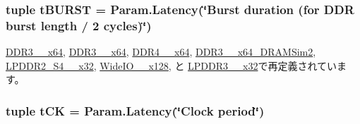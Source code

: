 \label{classDRAMCtrl_1_1DRAMCtrl_a37607d1e67471a6c3fdd8746152f911a}
\hypertarget{classDRAMCtrl_1_1DRAMCtrl_a8c64ef2dd5b5213f7c25ecffd077591f}{
\subsubsection[{tBURST}]{\setlength{\rightskip}{0pt plus 5cm}tuple {\bf tBURST} = Param.Latency(\char`\"{}Burst duration (for DDR burst length / 2 cycles)\char`\"{})}}
\label{classDRAMCtrl_1_1DRAMCtrl_a8c64ef2dd5b5213f7c25ecffd077591f}


\hyperlink{classDRAMCtrl_1_1DDR3__1600__x64_af962cc8ff13de9c28027368562b67c1e}{DDR3\_\_\-x64}, \hyperlink{classDRAMCtrl_1_1DDR3__2133__x64_af962cc8ff13de9c28027368562b67c1e}{DDR3\_\_\-x64}, \hyperlink{classDRAMCtrl_1_1DDR4__2400__x64_af962cc8ff13de9c28027368562b67c1e}{DDR4\_\_\-x64}, \hyperlink{classDRAMCtrl_1_1DDR3__1333__x64__DRAMSim2_af962cc8ff13de9c28027368562b67c1e}{DDR3\_\_\-x64\_\-DRAMSim2}, \hyperlink{classDRAMCtrl_1_1LPDDR2__S4__1066__x32_af962cc8ff13de9c28027368562b67c1e}{LPDDR2\_\-S4\_\_\-x32}, \hyperlink{classDRAMCtrl_1_1WideIO__200__x128_af962cc8ff13de9c28027368562b67c1e}{WideIO\_\_\-x128}, と \hyperlink{classDRAMCtrl_1_1LPDDR3__1600__x32_af962cc8ff13de9c28027368562b67c1e}{LPDDR3\_\_\-x32}で再定義されています。\hypertarget{classDRAMCtrl_1_1DRAMCtrl_a028d6bb21e2386ba31699d3c56396a6f}{
\subsubsection[{tCK}]{\setlength{\rightskip}{0pt plus 5cm}tuple {\bf tCK} = Param.Latency(\char`\"{}Clock period\char`\"{})}}
\label{classDRAMCtrl_1_1DRAMCtrl_a028d6bb21e2386ba31699d3c56396a6f}


